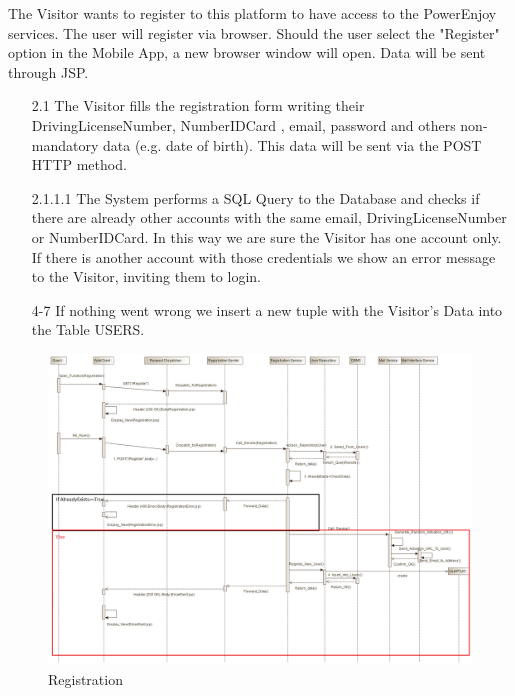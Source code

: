\documentclass[12pt]{article}
\begin{document}
The Visitor wants to register to this platform to have access to the PowerEnjoy services.
The user will register via browser. Should the user select the "Register" option in the Mobile App, a new browser window will open. Data will be sent through JSP.
\begin{enumerate}
	\item[2.1] The Visitor fills the registration form writing their DrivingLicenseNumber, NumberIDCard , email, password and others non-mandatory data (e.g. date of birth). This data will be sent via the POST HTTP method.
	\item[2.1.1.1] The System performs a SQL Query to the Database and checks if there are already other accounts with the same email, DrivingLicenseNumber or NumberIDCard. In this way we are sure the Visitor has one account only. If there is another account with those credentials we show an error message to the Visitor, inviting them to login.
	\item[4-7] If nothing went wrong we insert a new tuple with the Visitor's Data into the Table USERS. 
\end{enumerate}

\begin{figure}[h]
	\centering
	\includegraphics[width=\textwidth]{../Images/Sequence_Final/Registration}
	\caption{Registration}
\end{figure}
\clearpage
\end{document}
